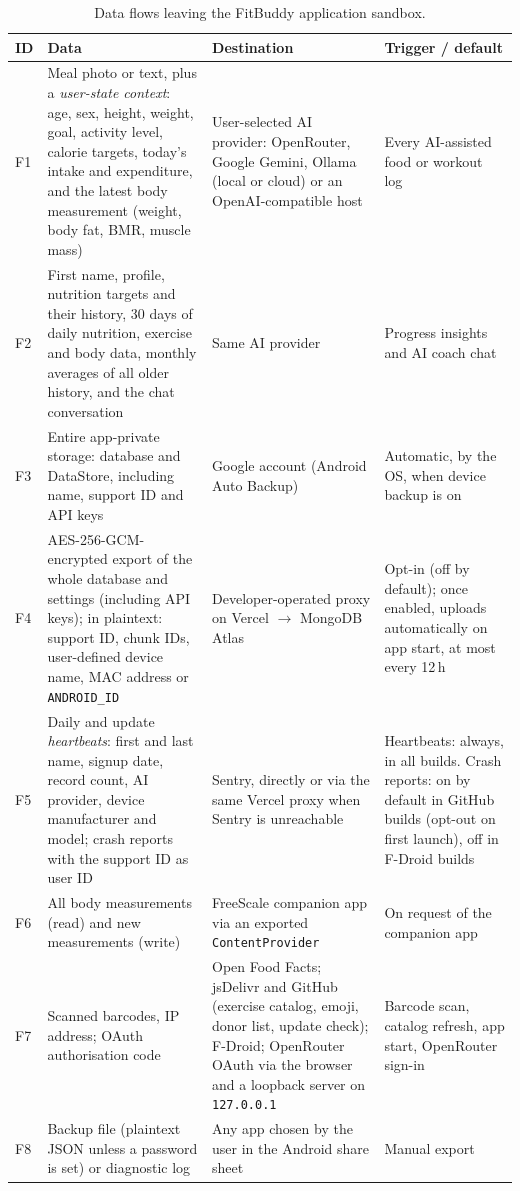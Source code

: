 \begin{table}[htbp]
\centering
\footnotesize
\caption{Data flows leaving the FitBuddy application sandbox.}
\label{tab:flows}
\begin{tabularx}{\textwidth}{@{}l L L L@{}}
\toprule
\textbf{ID} & \textbf{Data} & \textbf{Destination} & \textbf{Trigger / default} \\
\midrule
F1 & Meal photo or text, plus a \emph{user-state context}: age, sex, height, weight, goal,
     activity level, calorie targets, today's intake and expenditure, and the latest body
     measurement (weight, body fat, BMR, muscle mass)
   & User-selected AI provider: OpenRouter, Google Gemini, Ollama (local or cloud) or an
     OpenAI-compatible host
   & Every AI-assisted food or workout log \\
F2 & First name, profile, nutrition targets and their history, 30 days of daily nutrition,
     exercise and body data, monthly averages of all older history, and the chat conversation
   & Same AI provider
   & Progress insights and AI coach chat \\
F3 & Entire app-private storage: database and DataStore, including name, support ID and API
     keys
   & Google account (Android Auto Backup)
   & Automatic, by the OS, when device backup is on \\
F4 & AES-256-GCM-encrypted export of the whole database and settings (including API keys);
     in plaintext: support ID, chunk IDs, user-defined device name, MAC address or
     \texttt{ANDROID\_ID}
   & Developer-operated proxy on Vercel $\rightarrow$ MongoDB Atlas
   & Opt-in (off by default); once enabled, uploads automatically on app start, at most every
     12\,h \\
F5 & Daily and update \emph{heartbeats}: first and last name, signup date, record count, AI
     provider, device manufacturer and model; crash reports with the support ID as user ID
   & Sentry, directly or via the same Vercel proxy when Sentry is unreachable
   & Heartbeats: always, in all builds. Crash reports: on by default in GitHub builds
     (opt-out on first launch), off in F-Droid builds \\
F6 & All body measurements (read) and new measurements (write)
   & FreeScale companion app via an exported \texttt{ContentProvider}
   & On request of the companion app \\
F7 & Scanned barcodes, IP address; OAuth authorisation code
   & Open Food Facts; jsDelivr and GitHub (exercise catalog, emoji, donor list, update check);
     F-Droid; OpenRouter OAuth via the browser and a loopback server on \texttt{127.0.0.1}
   & Barcode scan, catalog refresh, app start, OpenRouter sign-in \\
F8 & Backup file (plaintext JSON unless a password is set) or diagnostic log
   & Any app chosen by the user in the Android share sheet
   & Manual export \\
\bottomrule
\end{tabularx}
\end{table}

